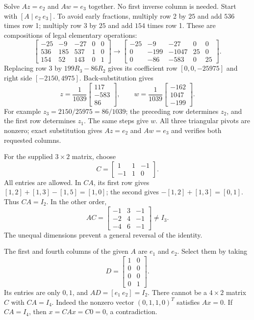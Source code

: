 Solve $Az=e_2$ and $Aw=e_3$ together. No first inverse column is needed.
Start with $[A\mid e_2\ e_3]$. To avoid early fractions, multiply row 2
by $25$ and add $536$ times row 1; multiply row 3 by $25$ and add $154$
times row 1. These are compositions of legal elementary operations:
\[
 \left[\begin{array}{rrr|rr}-25&-9&-27&0&0\\536&185&537&1&0\\154&52&143&0&1\end{array}\right]
 \longrightarrow
 \left[\begin{array}{rrr|rr}-25&-9&-27&0&0\\0&-199&-1047&25&0\\0&-86&-583&0&25\end{array}\right].
\]
Replacing row 3 by $199R_3-86R_2$ gives its coefficient row
$[0,0,-25975]$ and right side $[-2150,4975]$.
Back-substitution gives
\[
 z=\frac1{1039}\begin{bmatrix}117\\-583\\86\end{bmatrix},\qquad
 w=\frac1{1039}\begin{bmatrix}-162\\1047\\-199\end{bmatrix}.
\]
For example $z_3=2150/25975=86/1039$; the preceding row determines
$z_2$, and the first row determines $z_1$. The same steps give $w$.
All three triangular pivots are nonzero; exact substitution gives
$Az=e_2$ and $Aw=e_3$ and verifies both requested columns.

For the supplied $3\times2$ matrix, choose
\[
 C=\begin{bmatrix}1&1&-1\\-1&1&0\end{bmatrix}.
\]
All entries are allowed. In $CA$, its first row gives
$[1,2]+[1,3]-[1,5]=[1,0]$; the second gives
$-[1,2]+[1,3]=[0,1]$. Thus $CA=I_2$.
In the other order,
\[
 AC=\begin{bmatrix}-1&3&-1\\-2&4&-1\\-4&6&-1\end{bmatrix}\ne I_3.
\]
The unequal dimensions prevent a general reversal of the identity.

The first and fourth columns of the given $A$ are $e_1$ and $e_2$.
Select them by taking
\[
 D=\begin{bmatrix}1&0\\0&0\\0&0\\0&1\end{bmatrix}.
\]
Its entries are only $0,1$, and $AD=[e_1\ e_2]=I_2$.
There cannot be a $4\times2$ matrix $C$ with $CA=I_4$.
Indeed the nonzero vector $(0,1,1,0)^T$ satisfies $Ax=0$.
If $CA=I_4$, then $x=CAx=C0=0$, a contradiction.

